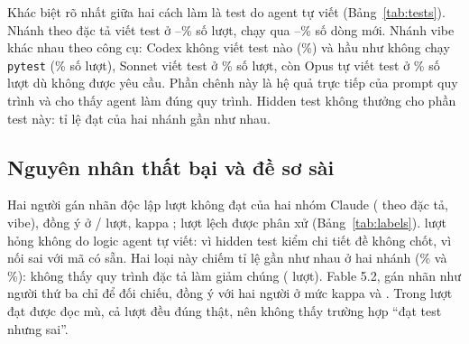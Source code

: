 \begin{table}[H]
\centering\small
\caption{Chi phí quy đổi theo giá API cho một lượt đạt (USD); với \texttt{codex-luna} là khoảng từ cận dưới
tới cận trên của giá}
\label{tab:cost}

\end{table}

Khác biệt rõ nhất giữa hai cách làm là test do agent tự viết (Bảng~\ref{tab:tests}). Nhánh theo đặc tả viết
test ở \NumResSonnetSpecTestsAnyPct{}--\NumResCodexSpecTestsAnyPct{}\% số lượt, chạy qua
\NumResSonnetSpecCovPct{}--\NumResOpusSpecCovPct{}\% số dòng mới. Nhánh vibe khác nhau theo công cụ: Codex không
viết test nào (\NumResCodexVibeTestsAnyPct{}\%) và hầu như không chạy \texttt{pytest}
(\NumResCodexVibePytestPct{}\% số lượt), Sonnet viết test ở \NumResSonnetVibeTestsAnyPct{}\% số lượt, còn Opus
tự viết test ở \NumResOpusVibeTestsAnyPct{}\% số lượt dù không được yêu cầu. Phần chênh này là hệ quả trực tiếp
của prompt quy trình và cho thấy agent làm đúng quy trình. Hidden test không thưởng cho phần test này: tỉ lệ đạt của hai
nhánh gần như nhau.

\begin{table}[H]
\centering\footnotesize\setlength{\tabcolsep}{4pt}
\caption{Test do agent viết, theo cohort và cách làm (mọi tầng). Coverage là tỉ lệ dòng mới ở
\texttt{backend/src} được test của chính agent chạy qua, tính 0 khi lượt không viết test.}
\label{tab:tests}

\end{table}

\subsection{Nguyên nhân thất bại và đề sơ sài}

Hai người gán nhãn độc lập \NumLabRuns{} lượt không đạt của hai nhóm Claude (\NumLabSpecRuns{} theo đặc tả,
\NumLabVibeRuns{} vibe), đồng ý ở \NumLabAgree{}/\NumLabRuns{} lượt, kappa \NumLabKappa{}; \NumLabAdjudicated{}
lượt lệch được phân xử (Bảng~\ref{tab:labels}). \NumLabOutside{} lượt hỏng không do logic agent tự viết:
\NumLabDeBaiThieuTotal{} vì hidden test kiểm chi tiết đề không chốt, \NumLabSaiApiCoSanTotal{} vì nối sai với mã có
sẵn. Hai loại này chiếm tỉ lệ gần như nhau ở hai nhánh (\NumLabOutsideSpecPct{}\% và \NumLabOutsideVibePct{}\%):
không thấy quy trình đặc tả làm giảm chúng (\NumLabRuns{} lượt). Fable 5.2, gán nhãn như người thứ ba chỉ để đối chiếu, đồng ý với hai
người ở mức kappa \NumLabFableKappaLoi{} và \NumLabFableKappaBao{}. Trong \NumPassCheckRuns{} lượt đạt được đọc
mù, cả \NumPassCheckCorrect{} lượt đều đúng thật, nên không thấy trường hợp ``đạt test nhưng sai''.

